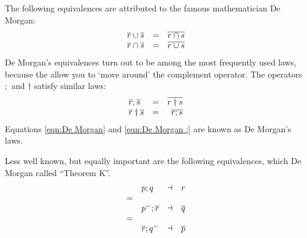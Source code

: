 \documentclass[11pt,a4paper,fleqn,oneside]{article}
\newcommand{\relAdd}{\dagger}
\newcommand{\flip}[1]{{#1}^\smallsmile}
\newcommand{\cmpl}[1]{\overline{#1}}
\newcommand{\compose}{;}
\newcommand{\subs}{\dashv}
\begin{document}
	The following equivalences are attributed to the famous mathematician De Morgan:
\begin{equation}
\begin{array}[m]{lcr}
	\cmpl{r}\cup\cmpl{s}&=&\cmpl{r\cap s}\\
	\cmpl{r}\cap\cmpl{s}&=&\cmpl{r\cup s}
\end{array}
\label{eqn:De Morgan}
\end{equation}
	De Morgan's equivalences turn out to be among the most frequently used laws,
	because the allow you to `move around' the complement operator.
	The operators $\compose$ and $\relAdd$ satisfy similar laws:
\begin{equation}
\begin{array}[m]{lcr}
	\cmpl{r}\compose\cmpl{s}&=&\cmpl{r\relAdd s}\\
	\cmpl{r}\relAdd\cmpl{s}&=&\cmpl{r\compose s}
\end{array}
\label{eqn:De Morgan ;}
\end{equation}
	Equations \ref{eqn:De Morgan} and \ref{eqn:De Morgan ;} are known as De Morgan's laws.
	
	Less well known, but equally important are the following equivalences, which De Morgan called ``Theorem K''.
\begin{equation}
\begin{array}[m]{llcr}
	&p\compose q&\subs&r\\=\\
	&\flip{p}\compose\cmpl{r}&\subs&\cmpl{q}\\=\\
	&\cmpl{r}\compose\flip{q}&\subs&\cmpl{p}
\end{array}
\label{eqn:theorem K}
\end{equation}
\end{document}
